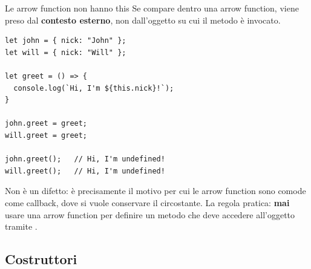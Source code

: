 \begin{warningbox}{{Le arrow function non hanno this}}
  Se  compare dentro una arrow function, viene preso dal
  \textbf{contesto esterno}, non dall'oggetto su cui il metodo è invocato.

\begin{affianco}[0.5][c]
\begin{lstlisting}[style=js, name=this-arrow.js]
let john = { nick: "John" };
let will = { nick: "Will" };

let greet = () => {
  console.log(`Hi, I'm ${this.nick}!`);
}

john.greet = greet;
will.greet = greet;

john.greet();   // Hi, I'm undefined!
will.greet();   // Hi, I'm undefined!
\end{lstlisting}
\risultato
\begin{immagine}
\end{immagine}
\end{affianco}

  Non è un difetto: è precisamente il motivo per cui le arrow function sono
  comode come callback, dove si vuole conservare il  circostante. La
  regola pratica: \textbf{mai} usare una arrow function per definire un metodo
  che deve accedere all'oggetto tramite .
\end{warningbox}

\subsection{Costruttori}

